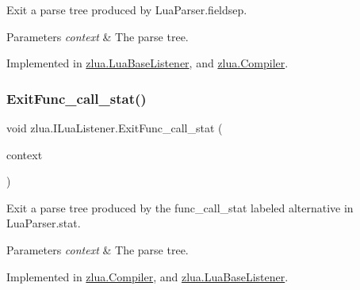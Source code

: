 Exit a parse tree produced by Lua\+Parser.\+fieldsep. 


\begin{DoxyParams}{Parameters}
{\em context} & The parse tree.\\
\hline
\end{DoxyParams}


Implemented in \mbox{\hyperlink{classzlua_1_1_lua_base_listener_aa7266127d89148ed4d6a559e5b59525e}{zlua.\+Lua\+Base\+Listener}}, and \mbox{\hyperlink{classzlua_1_1_compiler_a7a8e74fbfd05fe67a5f51db87236b3e8}{zlua.\+Compiler}}.

\mbox{\label{interfacezlua_1_1_i_lua_listener_ab9aba8c96896e86ec76ca5a87c5d2f25}} 
\subsubsection{\texorpdfstring{Exit\+Func\+\_\+call\+\_\+stat()}{ExitFunc\_call\_stat()}}
{\footnotesize\ttfamily void zlua.\+I\+Lua\+Listener.\+Exit\+Func\+\_\+call\+\_\+stat (\begin{DoxyParamCaption}\item[{\mbox{[}\+Not\+Null\mbox{]} \mbox{\hyperlink{classzlua_1_1_lua_parser_1_1_func__call__stat_context}{Lua\+Parser.\+Func\+\_\+call\+\_\+stat\+Context}}}]{context }\end{DoxyParamCaption})}



Exit a parse tree produced by the {\ttfamily func\+\_\+call\+\_\+stat} labeled alternative in Lua\+Parser.\+stat. 


\begin{DoxyParams}{Parameters}
{\em context} & The parse tree.\\
\hline
\end{DoxyParams}


Implemented in \mbox{\hyperlink{classzlua_1_1_compiler_aecbd4798190717227c32cbd132d996dd}{zlua.\+Compiler}}, and \mbox{\hyperlink{classzlua_1_1_lua_base_listener_a89ec0f76f1e78b15a72de26783bc6694}{zlua.\+Lua\+Base\+Listener}}.

\mbox{\label{interfacezlua_1_1_i_lua_listener_aa77991290b4d2ef6e498e68343ad8b28}} 
